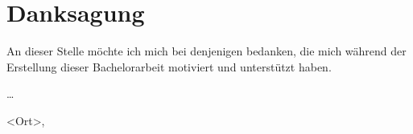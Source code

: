 \chapter*{Danksagung}\thispagestyle{empty}

An dieser Stelle möchte ich mich bei denjenigen bedanken, die mich während der Erstellung dieser Bachelorarbeit motiviert und unterstützt haben.

\bigskip

\dots

\bigskip

\authorofwork \hfill <Ort>, \dateofsubmission